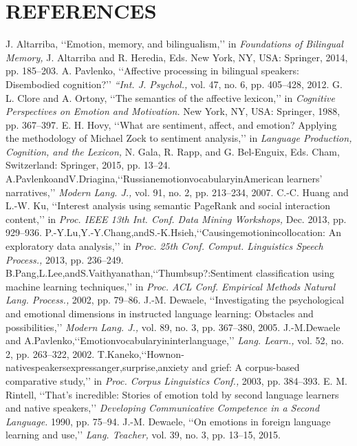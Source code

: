 \documentclass[a4paper,12pt,oneside]{article}
\begin{document}
\section{REFERENCES}
\begin{thebibliography}{9}


 J. Altarriba, ‘‘Emotion, memory, and bilingualism,’’ in \emph{Foundations of Bilingual Memory, }J. Altarriba and R. Heredia, Eds. New York, NY, USA: Springer, 2014, pp. 185–203.
 A. Pavlenko, ‘‘Affective processing in bilingual speakers: Disembodied cognition?’’ \emph{ “Int. J. Psychol., }vol. 47, no. 6, pp. 405–428, 2012.
 G. L. Clore and A. Ortony, ‘‘The semantics of the affective lexicon,’’ in \emph{Cognitive Perspectives on Emotion and Motivation. }New York, NY, USA: Springer, 1988, pp. 367–397.
 E. H. Hovy, ‘‘What are sentiment, affect, and emotion? Applying the methodology of Michael Zock to sentiment analysis,’’ in \emph{Language Production, Cognition, and the Lexicon, }N. Gala, R. Rapp, and G. Bel-Enguix, Eds. Cham, Switzerland: Springer, 2015, pp. 13–24.
 A.PavlenkoandV.Driagina,‘‘RussianemotionvocabularyinAmerican learners’ narratives,’’ \emph{Modern Lang. J., }vol. 91, no. 2, pp. 213–234, 2007.
 C.-C. Huang and L.-W. Ku, ‘‘Interest analysis using semantic PageRank and social interaction content,’’ in \emph{Proc. IEEE 13th Int. Conf. Data Mining Workshops, }Dec. 2013, pp. 929–936.
 P.-Y.Lu,Y.-Y.Chang,andS.-K.Hsieh,‘‘Causingemotionincollocation: An exploratory data analysis,’’ in \emph{Proc. 25th Conf. Comput. Linguistics Speech Process.,} 2013, pp. 236–249.
 B.Pang,L.Lee,andS.Vaithyanathan,‘‘Thumbsup?:Sentiment classification using machine learning techniques,’’ in \emph{Proc. ACL Conf. Empirical Methods Natural Lang. Process.,} 2002, pp. 79–86.
 J.-M. Dewaele, ‘‘Investigating the psychological and emotional dimensions in instructed language learning: Obstacles and possibilities,’’ \emph{Modern Lang. J.,} vol. 89, no. 3, pp. 367–380, 2005.
 J.-M.Dewaele and A.Pavlenko,‘‘Emotionvocabularyininterlanguage,’’ \emph{Lang. Learn.,} vol. 52, no. 2, pp. 263–322, 2002.
 T.Kaneko,‘‘Hownon-nativespeakersexpressanger,surprise,anxiety and grief: A corpus-based comparative study,’’ in \emph{Proc. Corpus Linguistics Conf.,} 2003, pp. 384–393.
 E. M. Rintell, ‘‘That’s incredible: Stories of emotion told by second language learners and native speakers,’’ \emph{Developing Communicative Competence in a Second Language.} 1990, pp. 75–94.
 J.-M. Dewaele, ‘‘On emotions in foreign language learning and use,’’ \emph{Lang. Teacher,} vol. 39, no. 3, pp. 13–15, 2015.

\end{thebibliography}
\end{document}
